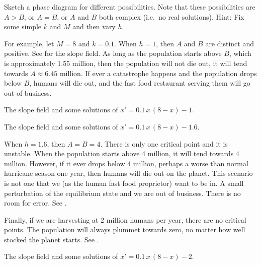 \begin{exercise}
Sketch a phase diagram for different possibilities.  Note
that these possibilities are $A > B$, or $A=B$, or $A$ and $B$ both complex
(i.e.\ no real solutions).  Hint: Fix some simple $k$ and $M$ and then vary
$h$.
\end{exercise}

For example, let $M=8$ and $k=0.1$.
When $h=1$, then $A$ and $B$ are distinct and positive.
See  for the slope field.  As long as 
the population starts above $B$, which is approximately 1.55 million, then
the population will not die out, it will tend towards $A \approx
6.45$ million.  If ever a catastrophe happens and
the population drops below $B$,
humans will die out, and the fast food restaurant serving them will go out
of business.

\begin{myfig}
\parbox[t]{3.0in}{
 \capstart
 \caption{The slope field and some solutions of
 $x' = 0.1\,x\,(8-x)-1$.\label{2.2:harv1}}
}
\quad
\parbox[t]{3.0in}{
 \capstart
 \caption{The slope field and some solutions of
 $x' = 0.1\,x\,(8-x)-1.6$.\label{2.2:harvc}}
}
\end{myfig}

When $h = 1.6$, then $A=B=4$.  There is only one critical point and it is
unstable.  When the population starts above 4 million, it will tend towards
4 million.  However, if it ever drops below 4 million, perhaps a worse than
normal hurricane season one year, then humans will die out on the
planet.  This scenario is not one that we (as the human fast food proprietor) 
want to be in.  A small perturbation of the equilibrium state and we are out
of business.  There is no room for error.  See .

Finally, if we are harvesting at 2 million humans per year, there are no
critical points.
The population
will always plummet towards zero, no matter how well stocked the planet
starts.  See .

\begin{myfig}
\capstart
{}
\caption{The slope field and some solutions of
$x' = 0.1\,x\,(8-x)-2$.\label{2.2:harv2}}
\end{myfig}


